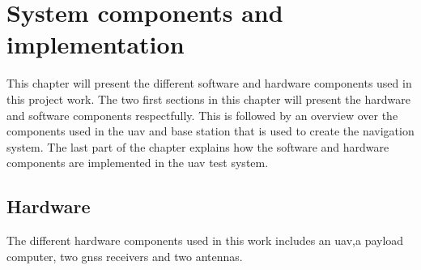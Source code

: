 
\chapter{System components and implementation}
This chapter will present the different software and hardware components used in this project work. The two first sections in this chapter will present the hardware and software components respectfully. This is followed by an overview over the components used in the \gls{uav} and base station that is used to create the navigation system. The last part of the chapter explains how the software and hardware components are implemented in the \gls{uav} test system.
\section{Hardware}
The different hardware components used in this work includes an \gls{uav},a payload computer, two \gls{gnss} receivers and two antennas.

